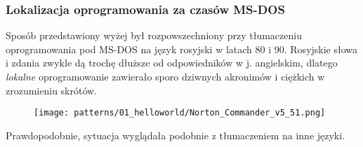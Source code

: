 \subsubsection{Lokalizacja oprogramowania za czasów MS-DOS}

Sposób przedstawiony wyżej był rozpowszechniony przy tłumaczeniu oprogramowania pod MS-DOS na język rosyjski w latach 80 i 90.
Rosyjskie słowa i zdania zwykle dą trochę dłuższe od odpowiedników w j. angielskim, dlatego \emph{lokalne} oprogramowanie zawierało 
sporo dziwnych akronimów i ciężkich w zrozumieniu skrótów.

\begin{figure}[H]
\centering
\texttt{[image: patterns/01\_helloworld/Norton\_Commander\_v5\_51.png]}
\caption{\PLph{}}
\end{figure}

Prawdopodobnie, sytuacja wyglądała podobnie z tłumaczeniem na inne języki.

